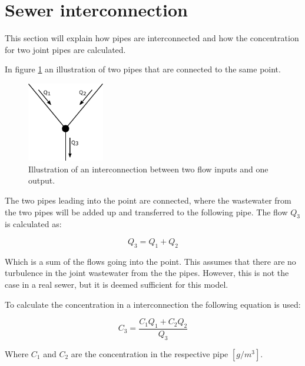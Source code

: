 \section{Sewer interconnection}\label{se:sewer_interconnection}
This section will explain how pipes are interconnected and how the concentration for two joint pipes are calculated.

In figure \ref{fig:interconnections} an illustration of two pipes that are connected to the same point.

\begin{figure}[H]
\centering
\includegraphics[width=0.30\textwidth]{report/modeling/pictures/interconnections}
\caption{Illustration of an interconnection between two flow inputs and one output.}
\label{fig:interconnections}
\end{figure} 

The two pipes leading into the point are connected, where the wastewater from the two pipes will be added up and transferred to the following pipe. The flow $Q_3$ is calculated as:

\begin{equation}
	\boxed{Q_3 = Q_1 + Q_2}
\end{equation} 

Which is a sum of the flows going into the point. This assumes that there are no turbulence in the joint wastewater from the the pipes. However, this is not the case in a real sewer, but it is deemed sufficient for this model. 

To calculate the concentration in a interconnection the following equation is used: %

\begin{equation}\label{poop_addition_interconnection}
	\boxed{C_3 = \frac{C_1 Q_1 + C_2 Q_2}{Q_3}}
\end{equation}

Where $C_1$ and $C_2$ are the concentration in the respective pipe $\left[g /m^3 \right]$.    


